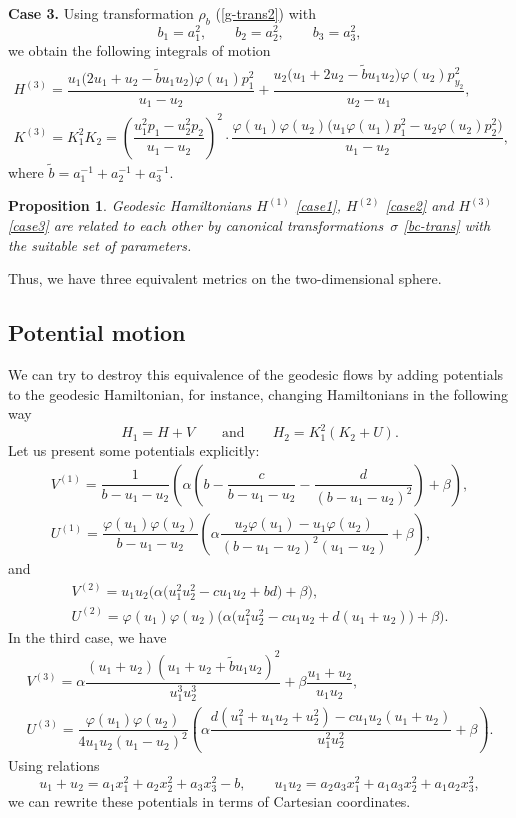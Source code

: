 \documentclass[10pt,a4paper]{amsart}
\numberwithin{equation}{section}
\newtheorem{Proposition}[Theorem]{Proposition}
 { \theoremstyle{definition}
\newtheorem{Definition}[Theorem]{Definition}
\newtheorem{Note}[Theorem]{Note}
\newtheorem{Example}[Theorem]{Example}
\newtheorem{Remark}[Theorem]{Remark} }
\begin{document}
\textbf{Case 3.} Using transformation $\rho_b$ (\ref{g-trans2}) with
\[b_1=a_1^2,\qquad b_2=a_2^2,\qquad b_3=a_3^2,\]
 we obtain the following integrals of motion
\begin{gather}
H^{(3)}= \dfrac{u_1\bigl( 2u_1+u_2-\tilde{b}u_1 u_2\bigr)\varphi(u_1)p_1^2}{u_1-u_2}+
\dfrac{u_2\bigl( u_1+2u_2-\tilde{b}u_1u_2 \bigr)\varphi(u_2)p_{y_2}^2}{u_2-u_1},\nonumber\\
K^{(3)}=K_1^2K_2=\left(\dfrac{u_1^2p_{1}-u_2^2p_{2}}{u_1-u_2}\right)^2\cdot
\dfrac{\varphi(u_1)\varphi(u_2)\bigl(u_1\varphi(u_1)p_{1}^2-u_2\varphi(u_2)p_{2}^2\bigr)}{u_1-u_2} , \label{case3}
\end{gather}
where $\tilde{b}=a_1^{-1}+a_2^{-1}+a_3^{-1}$.

\begin{Proposition}
Geodesic Hamiltonians $H^{(1)}$ \eqref{case1}, $H^{(2)}$ \eqref{case2} and $H^{(3)}$ \eqref{case3} are related to each other by canonical transformations~$\sigma$ \eqref{bc-trans} with the suitable set of parameters.
\end{Proposition}
Thus, we have three equivalent metrics on the two-dimensional sphere.

\subsection{Potential motion}
We can try to destroy this equivalence of the geodesic flows by adding potentials to the geodesic Hamiltonian, for instance,
changing Hamiltonians in the following way
\[H_1=H+V\qquad\mbox{and}\qquad H_2=K_1^2(K_2+U) .\]
Let us present some potentials explicitly:
\begin{gather*}
V^{(1)}=\dfrac{1}{b-u_1-u_2} \left( \alpha\left(b-\dfrac{c}{b-u_1-u_2} -\dfrac{d}{(b-u_1-u_2)^2}\right)+\beta\right) ,\\
U^{(1)}=\dfrac{\varphi(u_1)\varphi(u_2)}{b-u_1-u_2} \left(\alpha \dfrac{u_2\varphi(u_1)-u_1\varphi(u_2)}{(b - u_1 - u_2)^2(u_1-u_2)}+\beta\right) ,
\end{gather*}
and
\begin{gather*}
V^{(2)}=u_1u_2\big(\alpha\bigl(u_1^2u_2^2-cu_1u_2+bd\big)+\beta\big) ,\\
U^{(2)}=\varphi(u_1)\varphi(u_2)\big(\alpha\big(u_1^2u_2^2 - cu_1u_2 + d(u_1 + u_2)\big)+\beta\big) .
\end{gather*}
In the third case, we have
\begin{gather*}
V^{(3)}= \alpha \dfrac{(u_1 + u_2)(u_1 +u_2 +\tilde{b} u_1u_2)^2}{u_1^3u_2^3}+\beta \dfrac{ u_1 + u_2}{u_1u_2} ,
\\
U^{(3)}=  \dfrac{\varphi(u_1)\varphi(u_2)}{4u_1u_2(u_1-u_2)^2}
\left(\alpha
\dfrac{d(u_1^2 + u_1u_2 + u_2^2) -c u_1u_2(u_1 + u_2)}{u_1^2u_2^2}
+\beta
\right) .
\end{gather*}
Using relations
\[
u_1+u_2=a_1x_1^2+a_2x_2^2+a_3x_3^2-b ,\qquad u_1u_2=a_2a_3x_1^2+a_1a_3x_2^2+a_1a_2x_3^2,\]
we can rewrite these potentials in terms of Cartesian coordinates.
\end{document}
